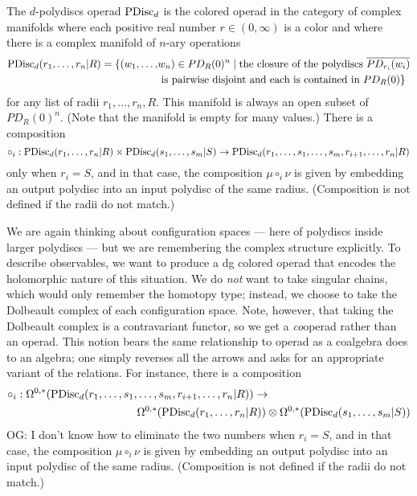 \documentclass[11pt]{amsart}
\def\owen#1{{\textcolor{violet!65!black}{OG: {#1}}}}
\begin{document}
\begin{dfn}
The {$d$-polydiscs operad} ${\rm PDisc}_d$ is the colored operad in the category of complex manifolds where each positive real number $r \in (0,\infty)$ is a color 
and where there is a complex manifold of $n$-ary operations
\begin{align*}
{\rm PDisc}_d(r_1, \ldots, r_n| R) = \{ (w_1, \ldots,& w_n) \in PD_R(0)^n \;|\; 
\text{the closure of the polydiscs $\overline{PD_{r_i}(w_i)}$}\\ 
&\text{ is pairwise disjoint and each is contained in $PD_R(0)$}\}
\end{align*}
for any list of radii $r_1,\ldots, r_n, R$.
This manifold is always an open subset of~$PD_R(0)^n$. 
(Note that the manifold is empty for many values.)
There is a composition
\[
\circ_i: {\rm PDisc}_d(r_1, \ldots, r_n| R) \times {\rm PDisc}_d(s_1, \ldots, s_m| S) \to {\rm PDisc}_d(r_1, \ldots, s_1, \ldots, s_m, r_{i+1}, \ldots, r_n| R)
\]
only when $r_i = S$, 
and in that case, the composition $\mu \circ_i \nu$ is given by embedding an output polydisc into an input polydisc of the same radius.
(Composition is not defined if the radii do not match.)
\end{dfn}

We are again thinking about configuration spaces --- here of polydiscs inside larger polydiscs --- but we are remembering the complex structure explicitly.
To describe observables, we want to produce a dg colored operad that encodes the holomorphic nature of this situation.
We do {\em not} want to take singular chains, which would only remember the homotopy type;
instead, we choose to take the Dolbeault complex of each configuration space.
Note, however, that taking the Dolbeault complex is a contravariant functor,
so we get a {\em co}\/operad rather than an operad.
This notion bears the same relationship to operad as a coalgebra does to an algebra;
one simply reverses all the arrows and asks for an appropriate variant of the relations.
For instance, there is a composition
\begin{align}
\label{pdcirc}
\circ_i: \Omega^{0,*}({\rm PDisc}_d(r_1, \ldots, s_1, &\ldots, s_m, r_{i+1}, \ldots, r_n| R)) \to \\
&\Omega^{0,*}({\rm PDisc}_d(r_1, \ldots, r_n| R)) \otimes \Omega^{0,*}({\rm PDisc}_d(s_1, \ldots, s_m| S))
\end{align}
\owen{I don't know how to eliminate the two numbers}
when $r_i = S$, and in that case, the composition $\mu \circ_i \nu$ is given by embedding an output polydisc into an input polydisc of the same radius.
(Composition is not defined if the radii do not match.)
\end{document}
